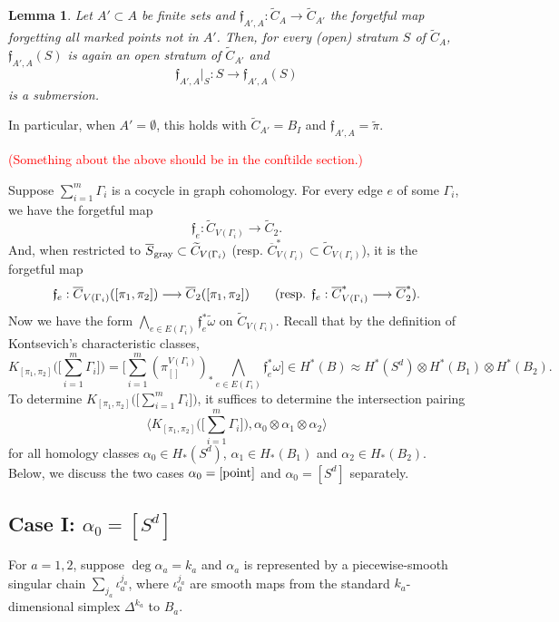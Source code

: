 \documentclass[11pt]{article}
\newtheorem{lmm}[thm]{Lemma}
\theoremstyle{definition}
\theoremstyle{remark}
\def\wt#1{\widetilde{#1}}
\def\ov#1{\overline{#1}}
\def\sgray{{\textnormal{gray}}}
\def\ff{\mathfrak{f}}
\def\cmt#1{\textcolor{red}{(#1)}}
\def\tn#1{\textnormal{#1}}
\begin{document}
\begin{lmm}
Let $A'\subset A$ be finite sets and $\ff_{A',A}:\wt{C}_{A}\to\wt{C}_{A'}$ the forgetful map forgetting all marked points not in $A'$. 
Then, for every (open) stratum $S$ of $\wt{C}_{A}$, $\ff_{A',A}(S)$ is again an open stratum of $\wt{C}_{A'}$ and 
$$\ff_{A',A}|_S:S\longrightarrow \ff_{A',A}(S)$$
is a submersion. 
\end{lmm}

In particular, when $A'=\emptyset$, this holds with $\wt{C}_{A'}=B_I$ and $\ff_{A',A}=\tilde{\pi}$. 

\cmt{Something about the above should be in the conftilde section.}


Suppose $\sum_{i=1}^{m}\Gamma_i$ is a cocycle in graph cohomology. 
For every edge $e$ of some $\Gamma_i$, we have the forgetful map 
$$\ff_e:\wt{C}_{V(\Gamma_i)}\longrightarrow\wt{C}_2.$$
And, when restricted to $\ov{S}_{\sgray}\subset\wt{C}_{V(\Gamma_i)}$ (resp. $\ov{C}_{V(\Gamma_i)}^*\subset\wt{C}_{V(\Gamma_i)}$), it is the forgetful map
$$\ff_e:\ov{C}_{V(\Gamma_i)}([\pi_1,\pi_2])\longrightarrow\ov{C}_2([\pi_1,\pi_2]) \qquad (\tn{resp. } \ff_e:\ov{C}^*_{V(\Gamma_i)}\longrightarrow\ov{C}^*_2).$$
Now we have the form $\bigwedge_{e\in E(\Gamma_i)}\ff_e^*\wt{\omega}$ on $\wt{C}_{V(\Gamma_i)}$. 
Recall that by the definition of Kontsevich's characteristic classes, 
$$K_{[\pi_1,\pi_2]}\big(\big[\sum_{i=1}^m\Gamma_i\big]\big)=
\big[\sum_{i=1}^m (\pi_{[]}^{V(\Gamma_i)})_*\bigwedge_{e\in E(\Gamma_i)}\ff_e^*{\omega}\big]\in H^*(B)\approx H^*(S^d)\otimes H^*(B_1)\otimes H^*(B_2).
$$
To determine $K_{[\pi_1,\pi_2]}\big(\big[\sum_{i=1}^m\Gamma_i\big]\big)$, it suffices to determine the intersection pairing 
$$\big\langle K_{[\pi_1,\pi_2]}\big(\big[\sum_{i=1}^m\Gamma_i\big]\big), \alpha_0\otimes\alpha_1\otimes\alpha_2\big\rangle$$
for all homology classes $\alpha_0\in H_*(S^d)$, $\alpha_1\in H_*(B_1)$ and $\alpha_2\in H_*(B_2)$. 
Below, we discuss the two cases $\alpha_0=[\tn{point}]$ and $\alpha_0=[S^d]$ separately. 

\subsection*{Case I: $\alpha_0=[S^d]$}

For $a=1,2$, suppose $\deg\alpha_a=k_a$ and $\alpha_a$ is represented by a piecewise-smooth singular chain $\sum_{j_a}\iota^{j_a}_a$, 
where $\iota^{j_a}_a$ are smooth maps from the standard $k_a$-dimensional simplex $\Delta^{k_a}$ to $B_a$. 
\end{document}

